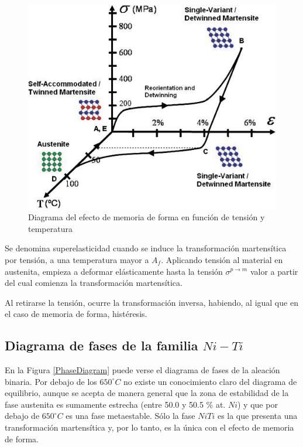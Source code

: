 \documentclass[12pt]{article}
\theoremstyle{definition}
\theoremstyle{remark}
\begin{document}
\begin{figure}[H]
	\centering
	\includegraphics[scale=0.5]{img/3dCycle.png}
	\caption{Diagrama del efecto de memoria de forma en función de tensión y temperatura}
	\label{3DGraph}
\end{figure}


Se denomina superelasticidad cuando se induce la transformación martensítica por tensión, a una temperatura mayor a $A_f$. Aplicando tensión al material en austenita, empieza a deformar elásticamente hasta la tensión $\sigma^{p \rightarrow m}$ valor a partir del cual comienza la transformación martensítica.

Al retirarse la tensión, ocurre la transformación inversa, habiendo, al igual que en el caso de memoria de forma, histéresis.


\subsection{Diagrama de fases de la familia $Ni-Ti$}

En la Figura \ref{PhaseDiagram} puede verse el diagrama de fases de la aleación binaria. Por debajo de los $650 ^\circ C$ no existe un conocimiento claro del diagrama de equilibrio, aunque se acepta de manera general que la zona de estabilidad de la fase austenita es sumamente estrecha (entre 50.0 y 50.5 \% at. $Ni$) y que por debajo de $650^\circ C$ es una fase metaestable. Sólo la fase $NiTi$ es la que presenta una transformación martensítica y, por lo tanto, es la única con el efecto de memoria de forma.
\end{document}
